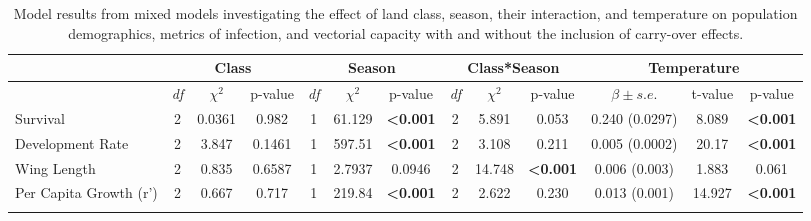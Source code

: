 \documentclass[12pt]{article}
\begin{document}
\newpage




\begin{landscape}

\begin{table}[]
\centering
\caption{Model results from mixed models investigating the effect of land class, season, their interaction, and temperature on population demographics, metrics of infection, and vectorial capacity with and without the inclusion of carry-over effects.}
\label{table:modelResults}
\begin{tabular}{l|ccc|ccc|ccc|ccc}
                                  & \multicolumn{3}{c}{\textbf{Class}}             & \multicolumn{3}{c}{\textbf{Season}}            & \multicolumn{3}{c}{\textbf{Class*Season}}      & \multicolumn{3}{c}{\textbf{Temperature}}             \\
\hline
                                  & \textit{df} & $\chi^2$  & p-value                 & \textit{df} & $\chi^2$  & p-value                 & \textit{df} & $\chi^2$  & p-value                 & $\beta \pm s.e.$          & t-value & p-value                 \\
\hline
Survival                    & 2           & 0.0361    & 0.982                   & 1           & 61.129    & \textbf{\textless0.001} & 2           & 5.891     & 0.053                   & 0.240 (0.0297)   & 8.089   & \textbf{\textless0.001} \\
Development Rate            & 2           & 3.847     & 0.1461                  & 1           & 597.51    & \textbf{\textless0.001} & 2           & 3.108     & 0.211                   & 0.005 (0.0002)   & 20.17   & \textbf{\textless0.001} \\
Wing Length                 & 2           & 0.835     & 0.6587                  & 1           & 2.7937    & 0.0946                  & 2           & 14.748    & \textbf{\textless0.001} & 0.006 (0.003)    & 1.883   & 0.061                   \\
Per Capita Growth (r')      & 2           & 0.667     & 0.717                   & 1           & 219.84    & \textbf{\textless0.001} & 2           & 2.622     & 0.230                   & 0.013 (0.001)    & 14.927  & \textbf{\textless0.001}  \\
                            &             &           &                         &             &           &                         &             &           &                         &                  &         &                         \\

\end{tabular}
\end{table}
\end{landscape}
\end{document}
